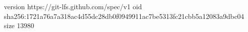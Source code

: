 version https://git-lfs.github.com/spec/v1
oid sha256:1721a76a7a318ac4d55dc28db0f0949911ac7be5313fc21cbb5a12083a9dbc04
size 13980
